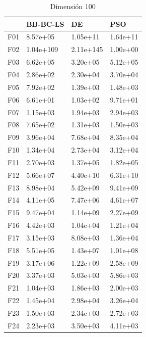\begin{table}[H]
\begin{minipage}{.5\linewidth}
    \end{minipage}%
    \begin{minipage}{.5\linewidth}
      \centering
      \caption{Dimensión 100}
      \begin{tabular}{llll}
        \toprule
        {} &   BB-BC-LS &         DE &       PSO \\
        \midrule
        F01  &   8.57e+05 &   1.05e+11 &  1.64e+11 \\
        F02  &  1.04e+109 &  2.11e+145 &  1.00e+00 \\
        F03  &   6.62e+05 &   3.20e+05 &  5.12e+05 \\
        F04  &   2.86e+02 &   2.30e+04 &  3.70e+04 \\
        F05  &   7.92e+02 &   1.39e+03 &  1.48e+03 \\
        F06  &   6.61e+01 &   1.03e+02 &  9.71e+01 \\
        F07  &   1.15e+03 &   1.94e+03 &  2.94e+03 \\
        F08  &   7.65e+02 &   1.31e+03 &  1.50e+03 \\
        F09  &   3.96e+04 &   7.68e+04 &  8.35e+04 \\
        F10  &   1.34e+04 &   2.73e+04 &  3.12e+04 \\
        F11  &   2.70e+03 &   1.37e+05 &  1.82e+05 \\
        F12  &   5.66e+07 &   4.40e+10 &  6.31e+10 \\
        F13  &   8.98e+04 &   5.42e+09 &  9.41e+09 \\
        F14  &   4.11e+05 &   7.47e+06 &  4.61e+07 \\
        F15  &   9.47e+04 &   1.14e+09 &  2.27e+09 \\
        F16  &   4.42e+03 &   1.04e+04 &  1.21e+04 \\
        F17  &   3.15e+03 &   8.08e+03 &  1.36e+04 \\
        F18  &   5.51e+05 &   1.43e+07 &  1.01e+08 \\
        F19  &   3.17e+06 &   1.22e+09 &  2.58e+09 \\
        F20  &   3.37e+03 &   5.03e+03 &  5.86e+03 \\
        F21  &   1.04e+03 &   1.86e+03 &  2.00e+03 \\
        F22  &   1.45e+04 &   2.98e+04 &  3.26e+04 \\
        F23  &   1.50e+03 &   2.34e+03 &  2.72e+03 \\
        F24  &   2.23e+03 &   3.50e+03 &  4.11e+03 \\

\end{tabular}
\end{minipage}
\end{table}
